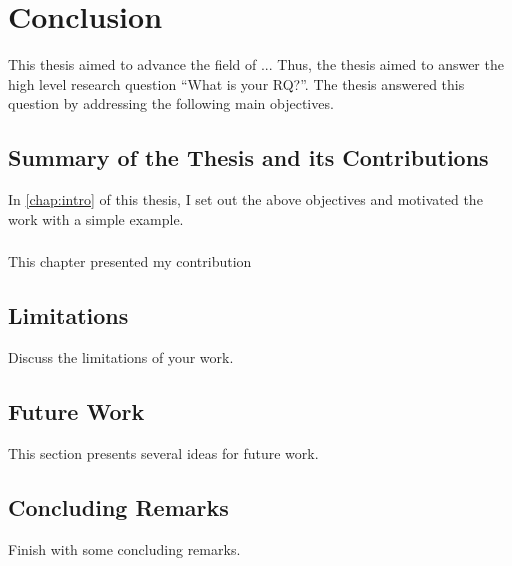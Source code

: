 \chapter{Conclusion}\label{chap:conclusion}
This thesis aimed to advance the field of ... Thus, the thesis aimed to answer the high level research question ``What is your RQ?''. The thesis answered this question by addressing the following main objectives.



\section{Summary of the Thesis and its Contributions}
In \autoref{chap:intro} of this thesis, I set out the above objectives and motivated the work with a simple example.

\subsection*{}
This chapter presented my contribution


\section{Limitations}
Discuss the limitations of your work.

\section{Future Work}
This section presents several ideas for future work.

\section{Concluding Remarks}
Finish with some concluding remarks.
